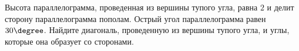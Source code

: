 \begin{ex}
	\begin{condition}
		Высота параллелограмма, проведенная из вершины тупого угла, равна \( 2 \) и делит сторону параллелограмма пополам. Острый угол параллелограмма равен \( 30\degree \). Найдите диагональ, проведенную из вершины тупого угла, и углы, которые она образует со сторонами.
	\end{condition}
\end{ex}